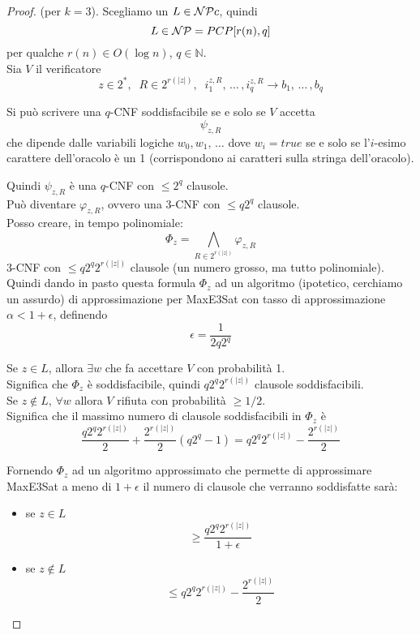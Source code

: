 \begin{proof}
	(per $k=3$). Scegliamo un $L \in \mathcal{NP} c$, quindi 
	$$ L \in \mathcal{NP} = PCP [r(n), q] $$
	per qualche $r(n) \in O(\log n)$, $q \in \mathbb{N}$.\\
	
	Sia $V$ il verificatore
	$$ z \in 2^\ast, \;\; R \in 2^{r(|z|)},\;\; i_1^{z,R}, \, \dots \, , i_q^{z,R} \rightarrow b_1, \, \dots \, ,b_q $$
	
	Si può scrivere una $q$-CNF soddisfacibile se e solo se $V$ accetta
	$$ \psi_{z,R} $$
	che dipende dalle variabili logiche $w_0, w_1, \, \dots$ dove $w_i = true$ se e solo se l'$i$-esimo carattere dell'oracolo è un 1 (corrispondono ai caratteri sulla stringa dell'oracolo).\\
	
	\newpage
	
	Quindi $\psi_{z,R}$ è una $q$-CNF con $\leq 2^q$ clausole.\\
	Può diventare $\varphi_{z,R}$, ovvero una 3-CNF con $\leq q 2^q$ clausole.\\
	
	Posso creare, in tempo polinomiale: 
	$$ \Phi_z = \bigwedge_{R \in 2^{r (|z|)}} \varphi_{z,R} $$
	3-CNF con $\leq q 2^q 2^{r (|z|)}$ clausole (un numero grosso, ma tutto polinomiale).\\
	
	Quindi dando in pasto questa formula $\Phi_z$ ad un algoritmo (ipotetico, cerchiamo un assurdo) di approssimazione per MaxE3Sat con tasso di approssimazione $\alpha < 1+ \epsilon$, definendo
	$$ \epsilon = \frac{1}{2q2^q} $$
	
	Se $z \in L$, allora $\exists w$ che fa accettare $V$ con probabilità 1.\\
	Significa che $\Phi_z$ è soddisfacibile, quindi $q2^q2^{r(|z|)}$ clausole soddisfacibili.\\
	
	Se $z \notin L$, $\forall w$ allora $V$ rifiuta con probabilità $\geq 1/2$.\\
	Significa che il massimo numero di clausole soddisfacibili in $\Phi_z$ è 
	$$ \frac{q2^q2^{r(|z|)}}{2} + \frac{2^{r(|z|)}}{2} (q2^q - 1) 
	=  q2^q2^{r(|z|)} - \frac{2^{r(|z|)}}{2}
	$$
	
	Fornendo $\Phi_z$ ad un algoritmo approssimato che permette di approssimare MaxE3Sat a meno di $1+\epsilon$ il numero di clausole che verranno soddisfatte sarà: 
	\begin{itemize}
		\item se $z \in L$
		$$ \geq \frac{q2^q 2^{r(|z|)}}{1 + \epsilon} $$
		\item se $z \notin L$
		$$ \leq q2^q2^{r(|z|)} - \frac{2^{r(|z|)}}{2} $$
	\end{itemize}
	

\end{proof}
